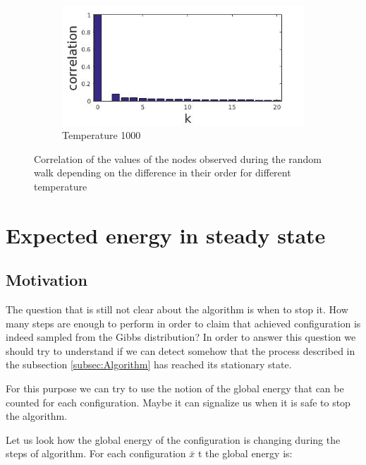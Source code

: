 \documentclass[12pt]{report}
\begin{document}
\begin{figure}[t]
\begin{subfigure}[b]{0.4\textwidth}
    \end{subfigure}   
    ~ 
    \begin{subfigure}[b]{0.4\textwidth}
        \includegraphics[width=\textwidth]{rggT1000corr}
        \caption{Temperature 1000}

    \end{subfigure}
    
    \caption{Correlation of the values of the nodes observed during the random walk depending on the difference in their order for different temperature}
    \label{fig:testGibbsCorr}
\end{figure}

\section{Expected energy in steady state}

\subsection{Motivation}

The question that is still not clear about the algorithm is when to stop it. How many steps are enough to perform in order to claim that achieved configuration is indeed sampled from the Gibbs distribution?
In order to answer this question we should try to understand if we can detect somehow that the process described in the subsection \ref{subsec:Algorithm} has reached its stationary state.

For this purpose we can try to use the notion of the global energy that can be counted for each configuration. Maybe it can signalize us when it is safe to stop the algorithm.

 
Let us look how the global energy of the configuration is changing during the steps of algorithm. For each configuration $\bar{x}$ t the global energy is:
\end{document}
